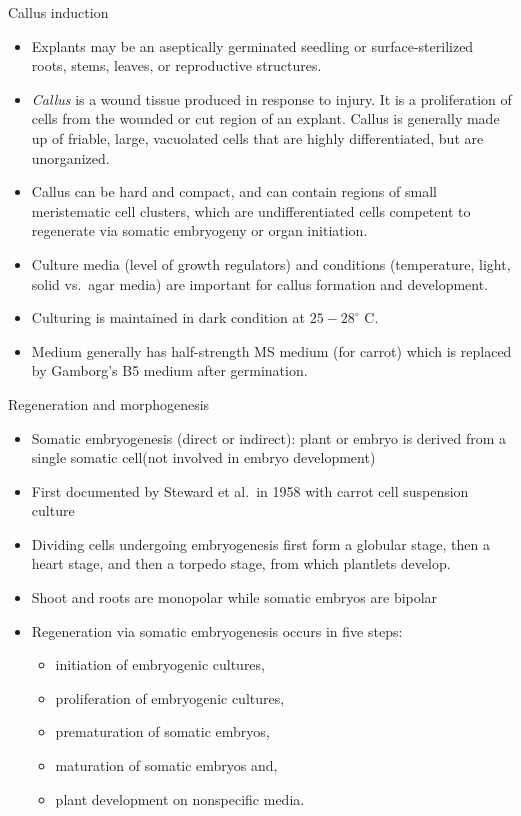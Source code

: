\documentclass[
  ignorenonframetext,
  aspectratio=169]{beamer}
\providecommand{\tightlist}{%
  \setlength{\itemsep}{0pt}\setlength{\parskip}{0pt}}
\begin{document}
\begin{frame}{Callus induction}
\protect\hypertarget{callus-induction}{}
\begin{itemize}
\tightlist
\item
  Explants may be an aseptically germinated seedling or
  surface-sterilized roots, stems, leaves, or reproductive structures.
\item
  \emph{Callus} is a wound tissue produced in response to injury. It is
  a proliferation of cells from the wounded or cut region of an explant.
  Callus is generally made up of friable, large, vacuolated cells that
  are highly differentiated, but are unorganized.
\item
  Callus can be hard and compact, and can contain regions of small
  meristematic cell clusters, which are undifferentiated cells competent
  to regenerate via somatic embryogeny or organ initiation.
\item
  Culture media (level of growth regulators) and conditions
  (temperature, light, solid vs.~agar media) are important for callus
  formation and development.
\item
  Culturing is maintained in dark condition at \(25-28^\circ\) C.
\item
  Medium generally has half-strength MS medium (for carrot) which is
  replaced by Gamborg's B5 medium after germination.
\end{itemize}
\end{frame}

\begin{frame}{Regeneration and morphogenesis}
\protect\hypertarget{regeneration-and-morphogenesis}{}
\begin{itemize}
\tightlist
\item
  Somatic embryogenesis (direct or indirect): plant or embryo is derived
  from a single somatic cell(not involved in embryo development)
\item
  First documented by Steward et al.~in 1958 with carrot cell suspension
  culture
\item
  Dividing cells undergoing embryogenesis first form a globular stage,
  then a heart stage, and then a torpedo stage, from which plantlets
  develop.
\item
  Shoot and roots are monopolar while somatic embryos are bipolar
\item
  Regeneration via somatic embryogenesis occurs in five steps:

  \begin{itemize}
  \tightlist
  \item
    initiation of embryogenic cultures,
  \item
    proliferation of embryogenic cultures,
  \item
    prematuration of somatic embryos,
  \item
    maturation of somatic embryos and,
  \item
    plant development on nonspecific media.
  \end{itemize}
\end{itemize}
\end{frame}
\end{document}
